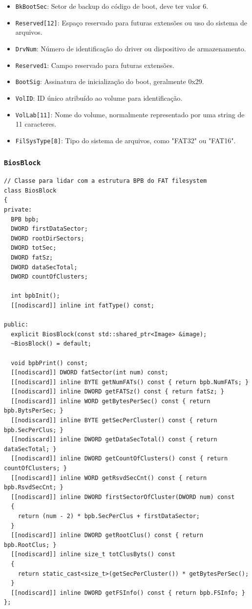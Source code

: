 \documentclass[
    12pt,				%
    oneside,   	        %
    a4paper,			%
    english,			%
    french,				%
    spanish,			%
    brazil,				%
    ]{pacotes/abntex2}
\begin{document}
\begin{itemize}
\begin{itemize}
            \item \texttt{BkBootSec}: Setor de backup do código de boot, deve ter valor 6.
            \item \texttt{Reserved[12]}: Espaço reservado para futuras extensões ou uso do sistema de arquivos.
            \item \texttt{DrvNum}: Número de identificação do driver ou dispositivo de armazenamento.
            \item \texttt{Reserved1}: Campo reservado para futuras extensões.
            \item \texttt{BootSig}: Assinatura de inicialização do boot, geralmente 0x29.
            \item \texttt{VolID}: ID único atribuído ao volume para identificação.
            \item \texttt{VolLab[11]}: Nome do volume, normalmente representado por uma string de 11 caracteres.
            \item \texttt{FilSysType[8]}: Tipo do sistema de arquivos, como "FAT32" ou "FAT16".
        \end{itemize}
\end{itemize}


\subsubsection{\texttt{BiosBlock}}
\label{subsubsec:bios_block}

\begin{lstlisting}[caption={Classe que abstrai a extração de informações da estrutura BPB}, label={lst:biosblock}]
// Classe para lidar com a estrutura BPB do FAT filesystem
class BiosBlock
{
private:
  BPB bpb;
  DWORD firstDataSector;
  DWORD rootDirSectors;
  DWORD totSec;
  DWORD fatSz;
  DWORD dataSecTotal;
  DWORD countOfClusters;

  int bpbInit();
  [[nodiscard]] inline int fatType() const;

public:
  explicit BiosBlock(const std::shared_ptr<Image> &image);
  ~BiosBlock() = default;

  void bpbPrint() const;
  [[nodiscard]] DWORD fatSector(int num) const;
  [[nodiscard]] inline BYTE getNumFATs() const { return bpb.NumFATs; }
  [[nodiscard]] inline DWORD getFATSz() const { return fatSz; }
  [[nodiscard]] inline WORD getBytesPerSec() const { return bpb.BytsPerSec; }
  [[nodiscard]] inline BYTE getSecPerCluster() const { return bpb.SecPerClus; }
  [[nodiscard]] inline DWORD getDataSecTotal() const { return dataSecTotal; }
  [[nodiscard]] inline DWORD getCountOfClusters() const { return countOfClusters; }
  [[nodiscard]] inline WORD getRsvdSecCnt() const { return bpb.RsvdSecCnt; }
  [[nodiscard]] inline DWORD firstSectorOfCluster(DWORD num) const
  {
    return (num - 2) * bpb.SecPerClus + firstDataSector;
  }
  [[nodiscard]] inline DWORD getRootClus() const { return bpb.RootClus; }
  [[nodiscard]] inline size_t totClusByts() const
  {
    return static_cast<size_t>(getSecPerCluster()) * getBytesPerSec();
  }
  [[nodiscard]] inline DWORD getFSInfo() const { return bpb.FSInfo; }
};
\end{lstlisting}
\end{document}
